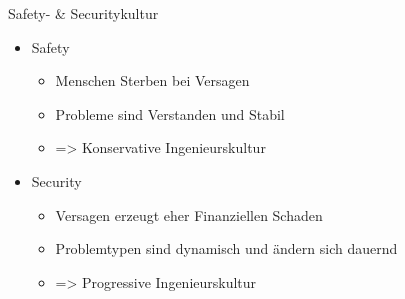 \begin{frame}[T]{Safety- \& Securitykultur}
  \begin{itemize}
    \item Safety
    \begin{itemize}
      \item Menschen Sterben bei Versagen
      \item Probleme sind Verstanden und Stabil
      \item => Konservative Ingenieurskultur
    \end{itemize}

    \item Security
    \begin{itemize}
      \item Versagen erzeugt eher Finanziellen Schaden
      \item Problemtypen sind dynamisch und ändern sich dauernd
      \item => Progressive Ingenieurskultur
    \end{itemize}
  \end{itemize}
\end{frame}

